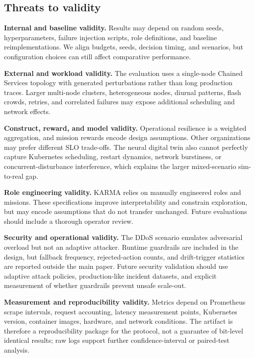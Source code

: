 \documentclass[journal]{IEEEtran}
\begin{document}
\subsection{Threats to validity}

\textbf{Internal and baseline validity.} Results may depend on random seeds, hyperparameters, failure injection scripts, role definitions, and baseline reimplementations. We align budgets, seeds, decision timing, and scenarios, but configuration choices can still affect comparative performance.

\textbf{External and workload validity.} The evaluation uses a single-node Chained Services topology with generated perturbations rather than long production traces. Larger multi-node clusters, heterogeneous nodes, diurnal patterns, flash crowds, retries, and correlated failures may expose additional scheduling and network effects.

\textbf{Construct, reward, and model validity.} Operational resilience is a weighted aggregation, and mission rewards encode design assumptions. Other organizations may prefer different SLO trade-offs. The neural digital twin also cannot perfectly capture Kubernetes scheduling, restart dynamics, network burstiness, or concurrent-disturbance interference, which explains the larger mixed-scenario sim-to-real gap.

\textbf{Role engineering validity.} KARMA relies on manually engineered roles and missions. These specifications improve interpretability and constrain exploration, but may encode assumptions that do not transfer unchanged. Future evaluations should include a thorough operator review.

\textbf{Security and operational validity.} The DDoS scenario emulates adversarial overload but not an adaptive attacker. Runtime guardrails are included in the design, but fallback frequency, rejected-action counts, and drift-trigger statistics are reported outside the main paper. Future security validation should use adaptive attack policies, production-like incident datasets, and explicit measurement of whether guardrails prevent unsafe scale-out.

\textbf{Measurement and reproducibility validity.} Metrics depend on Prometheus scrape intervals, request accounting, latency measurement points, Kubernetes version, container images, hardware, and network conditions. The artifact is therefore a reproducibility package for the protocol, not a guarantee of bit-level identical results; raw logs support further confidence-interval or paired-test analysis.
\end{document}
